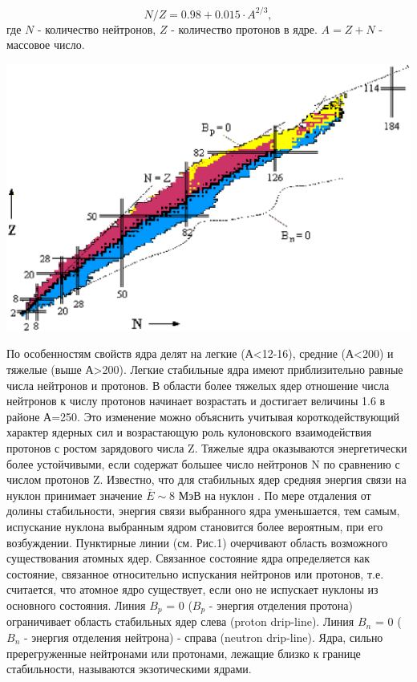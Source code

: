 $$N/Z = 0.98 + 0.015 \cdot A^{2/3},$$
где $N$ - количество нейтронов, $Z$ - количество протонов в ядре. $A = Z + N$ - массовое число\cite{inet}.

{
	\centering
	\includegraphics[width=1\linewidth]{NuclearMap.eps}
	\label{ris:NuclearMap}
}


По особенностям свойств ядра делят на легкие (А<12-16), средние (А<200) и тяжелые (выше А>200). Легкие стабильные ядра имеют приблизительно равные числа нейтронов и протонов. В области более тяжелых ядер отношение числа нейтронов к числу протонов начинает возрастать и достигает величины 1.6 в районе А=250. Это изменение можно объяснить учитывая короткодействующий характер ядерных сил и возрастающую роль кулоновского взаимодействия протонов с ростом зарядового числа Z. Тяжелые ядра оказываются энергетически более устойчивыми, если содержат большее число нейтронов N по сравнению с числом протонов Z. Известно, что для стабильных ядер средняя энергия связи на нуклон принимает значение $\bar{E}\sim8$ МэВ на нуклон \cite{inet}. По мере отдаления от долины стабильности, энергия связи выбранного ядра уменьшается, тем самым, испускание нуклона выбранным ядром становится более вероятным, при его возбуждении. Пунктирные линии (см. Рис.1) очерчивают область возможного существования атомных ядер. Связанное состояние ядра определяется как состояние, связанное относительно испускания нейтронов или протонов, т.е. считается, что атомное ядро существует, если оно не испускает нуклоны из основного состояния. Линия $B_p$ = 0 ($B_p$ - энергия отделения протона) ограничивает область стабильных ядер слева (proton drip-line). Линия $B_n$ = 0 ($B_n$ - энергия отделения нейтрона) - справа (neutron drip-line). Ядра, сильно пререгруженные нейтронами или протонами, лежащие близко к границе стабильности, называются экзотическими ядрами.

